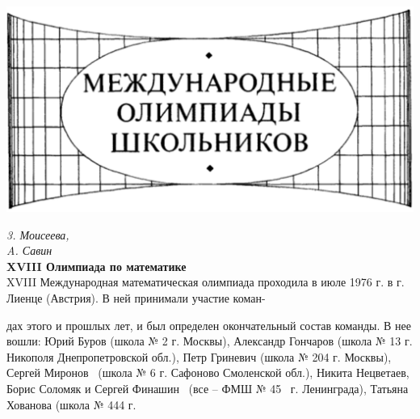 \begin{spacing}{0.8}
\newpage
\vspace{-10pt}
\includegraphics[width=\textwidth, scale=1.2]{images/kvant_math_olymp.png}
\setlength{\columnsep}{30pt}
\begin{minipage}{0.47\linewidth}
    \vspace{12pt}
    \textit{3. Моисеева, \\ 
            A. Савин}
    \\[12pt]
    {\Huge \textbf{XVIII Олимпиада по математике}}
    \\[12pt]
    XVIII Международная математическая олимпиада проходила в июле
    1976 г. в г. Лиенце (Австрия). В ней принимали участие коман-
\end{minipage}
\hspace{20pt}
\begin{minipage}{0.47\linewidth}
    \vspace{14pt}
    дах этого и прошлых лет, и был определен 
    окончательный состав команды.
    В нее вошли: Юрий Буров (школа
    № 2 г. Москвы), Александр Гончаров
    (школа № 13 г. Никополя Днепропетровской 
    обл.), Петр Гриневич (школа № 204 г. Москвы), 
    Сергей Миронов \ (школа № 6 г. Сафоново Смоленской 
    обл.), Никита Нецветаев, Борис
    Соломяк и Сергей Финашин \ (все --
    ФМШ № 45 \ г. Ленинграда), Татьяна Хованова (школа № 444 г. %

\end{minipage}

\end{spacing}
